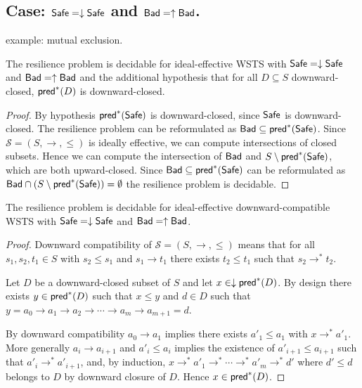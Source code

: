 



\subsection{Case: $\textsf{Safe}=\downarrow \textsf{Safe}$ and $\textsf{Bad}=\uparrow \textsf{Bad}$.}
%
%
example: mutual exclusion.

\begin{theorem}
The resilience problem is decidable for ideal-effective WSTS with 
$\textsf{Safe}=\downarrow \textsf{Safe}$
and $\textsf{Bad}=\uparrow \textsf{Bad}$
and
the additional hypothesis that
for all $D \subseteq S$ downward-closed, $\textsf{pred}^*(D)$ is downward-closed.
\end{theorem}

\begin{proof}
By hypothesis $\textsf{pred}^*(\textsf{Safe})$ is downward-closed, since $\textsf{Safe}$ is downward-closed.
The resilience problem can be reformulated as 
$\textsf{Bad} \subseteq  \textsf{pred}^*(\textsf{Safe})$.
Since $\mathscr{S}=(S,\rightarrow, \leq)$ is ideally effective, we can compute intersections of closed subsets.
Hence we can compute the intersection of
$\textsf{Bad}$
and
$S \setminus \textsf{pred}^*(\textsf{Safe})$,
which are both upward-closed.
Since
$\textsf{Bad} \subseteq \textsf{pred}^*(\textsf{Safe})$
can be reformulated as
$\textsf{Bad} \cap (S \setminus \textsf{pred}^*(\textsf{Safe})) = \emptyset$
the resilience problem is decidable.
\end{proof}

\begin{corollary}
The resilience problem is decidable for ideal-effective downward-compatible WSTS with 
$\textsf{Safe}=\downarrow \textsf{Safe}$
and $\textsf{Bad}=\uparrow \textsf{Bad}$.
\end{corollary}

\begin{proof}
Downward compatibility of $\mathscr{S}=(S,\rightarrow, \leq)$ 
means that
for all $s_1, s_2, t_1 \in S$ with
$s_2 \leq s_1$ and $s_1 \to t_1$
there
exists
$t_2 \leq t_1$ such that $s_2 \to^* t_2$.

Let $D$ be a downward-closed subset of $S$
and let $x \in \downarrow \textsf{pred}^*(D)$.
By design there exists
$y \in \textsf{pred}^*(D)$ 
such that $x \leq y$
and $d \in D$ such that
$y = a_0 \to a_1 \to a_2 \to \cdots \to a_m \to a_{m+1} = d$.

By downward compatibility $a_0 \to a_1$
implies there exists $a'_1 \leq a_1$ with
$x \to^* a'_1$.
More generally $a_i \to a_{i+1}$ and
$a'_i\leq a_i$ implies the existence of $a'_{i+1} \leq a_{i+1}$ such that
$a'_i \to^* a'_{i+1}$,
and, by induction,
 $x \to^* a'_1 \to^* \cdots \to^* a'_{m} \to^* d'$
where
$d' \leq d$ belongs to $D$ by downward closure of $D$.
Hence $x \in \textsf{pred}^*(D)$.
\end{proof}

